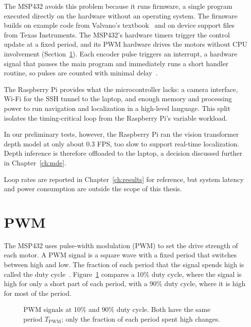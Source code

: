 The MSP432 avoids this problem because it runs firmware, a single program executed directly
on the hardware without an operating system. The firmware~\cite{cyclops_msp432_github} builds on
example code from Valvano's textbook~\cite{valvano} and on device support files from Texas
Instruments. The MSP432's hardware timers trigger the control update
at a fixed period, and its PWM hardware drives the motors without CPU involvement
(Section~\ref{sec:pwm}). Each encoder pulse triggers an interrupt, a hardware signal that
pauses the main program and immediately runs a short handler routine, so pulses are counted
with minimal delay~\cite{msp432_p4}.

The Raspberry Pi provides what the microcontroller lacks: a camera interface, Wi-Fi for
the SSH tunnel to the laptop, and enough memory and processing power to run navigation
and localization in a high-level language. This split isolates the timing-critical loop
from the Raspberry Pi's variable workload.

In our preliminary tests, however, the Raspberry Pi ran the vision transformer depth model at
only about 0.3 FPS, too slow to support real-time localization. Depth inference is therefore offloaded to the
laptop, a decision discussed further in Chapter~\ref{ch:mde}.

Loop rates are reported in Chapter~\ref{ch:results} for reference, but system latency and power
consumption are outside the scope of this thesis.

\section{PWM}
\label{sec:pwm}

The MSP432 uses pulse-width modulation (PWM) to set the drive strength of each motor. A
PWM signal is a square wave with a fixed period that switches between high and low. The
fraction of each period that the signal spends high is called the duty cycle~\cite{valvano}.
Figure~\ref{fig:pwm-duty} compares a 10\% duty cycle, where the signal is high for only
a short part of each period, with a 90\% duty cycle, where it is high for most of the
period.

\begin{figure}[htbp]
  \centering
  
  \caption[PWM signals at 10\% and 90\% duty cycle]{PWM signals at 10\% and 90\% duty
    cycle. Both have the same period $T_{\mathrm{PWM}}$; only the fraction of each
    period spent high changes.}
  \label{fig:pwm-duty}
\end{figure}

